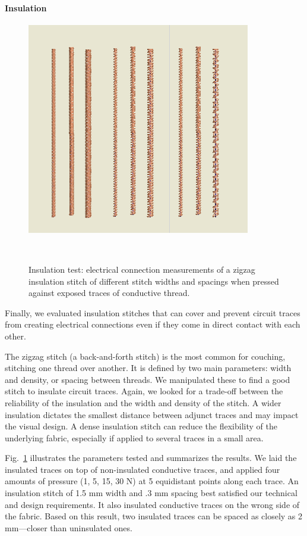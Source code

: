 \documentclass[header.tex]{subfiles}
\begin{document}
\paragraph{Insulation}
\begin{figure}
\centering
  \includegraphics[width=0.8\columnwidth]{figures/Insulation}
  \caption{Insulation test: electrical connection measurements of a zigzag insulation stitch of different stitch widths and spacings when pressed against exposed traces of conductive thread.}~\label{fig:Insulation}
  \vspace{-2em}
\end{figure}
Finally, we evaluated insulation stitches that can cover and prevent circuit traces from creating electrical connections even if they come in direct contact with each other.

The zigzag stitch (a back-and-forth stitch) is the most common for couching, stitching one thread over another. It is defined by two main parameters: width and density, or spacing between threads. We manipulated these to find a good stitch to insulate circuit traces. 
Again, we looked for a trade-off between the reliability of the insulation and the width and density of the stitch. A wider insulation dictates the smallest distance between adjunct traces and may impact the visual design. A dense insulation stitch can reduce the flexibility of the underlying fabric, especially if applied to several traces in a small area.

Fig.\ \ref{fig:Insulation} illustrates the parameters tested and summarizes the results.
We laid the insulated traces on top of non-insulated conductive traces, and applied four amounts of pressure (1, 5, 15, 30 N) at 5 equidistant points along each trace. An insulation stitch of 1.5 mm width and .3 mm spacing best satisfied our technical and design requirements. It also insulated conductive traces on the wrong side of the fabric. Based on this result, two insulated traces can be spaced as closely as 2 mm---closer than uninsulated ones.
\end{document}
